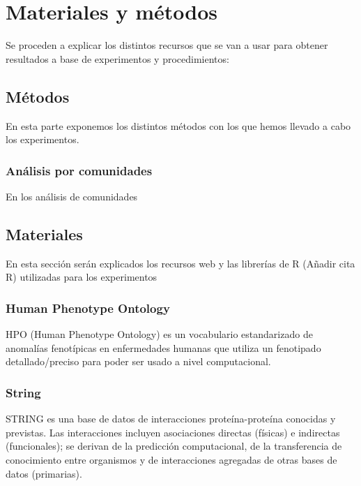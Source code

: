 \section{Materiales y métodos}

Se proceden a explicar los distintos recursos que se van a usar para obtener resultados a base de experimentos y procedimientos:

\subsection{Métodos}

En esta parte exponemos los distintos métodos con los que hemos llevado a cabo los experimentos.

\subsubsection{Análisis por comunidades}

En los análisis de comunidades \cite{Comun_Analisis} 


\subsection{Materiales}

En esta sección serán explicados los recursos web y las librerías de R (Añadir cita R) utilizadas para los experimentos

\subsubsection{Human Phenotype Ontology}

HPO (Human Phenotype Ontology)\cite{HPO_paper} es un vocabulario estandarizado de anomalías fenotípicas en enfermedades humanas que utiliza un fenotipado detallado/preciso para poder ser usado a nivel computacional.

\hfill

\subsubsection{String}

STRING \cite{String_paper} es una base de datos de interacciones proteína-proteína conocidas y previstas. Las interacciones incluyen asociaciones directas (físicas) e indirectas (funcionales); se derivan de la predicción computacional, de la transferencia de conocimiento entre organismos y de interacciones agregadas de otras bases de datos (primarias).

